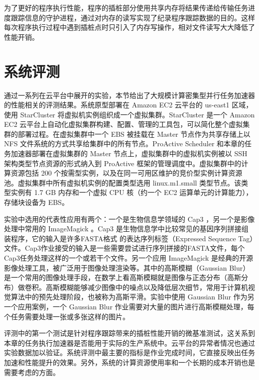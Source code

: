 为了更好的程序执行性能，程序的插桩部分使用共享内存将结果传递给传输任务进度跟踪信息的守护进程，通过对内存的读写实现了纪录程序跟踪数据的目的。这样每次程序执行过程中遇到插桩点时只引入了内存写操作，相对文件读写大大降低了性能开销。

\section{系统评测}
\label{sec:no2_eval}
通过一系列在云平台中展开的实验，本节给出了大规模计算密集型并行任务加速器的性能相关的评测结果。系统原型部署在 Amazon EC2 云平台的 us-east1 区域，使用 StarCluster \cite{starcluster} 将虚拟机实例组织成一个虚拟集群。StarCluster \cite{starcluster} 是一个 Amazon EC2 云平台上自动化虚拟集群构建、配置、管理的工具包，可以简化整个虚拟集群的部署过程。在虚拟集群中一个 EBS 被挂载在 Master 节点作为共享存储上以 NFS 文件系统的方式共享给集群中的所有节点。ProActive Scheduler 和本章的任务加速器部署在虚拟集群的 Master 节点上，虚拟集群中的虚拟机实例被以 SSH 架构类型节点资源的形式纳入到 ProActive 框架的管理调度中。虚拟集群中的计算资源包括 200 个按需型实例，以及在同一可用区维护的竞价型实例计算资源池。虚拟集群中所有虚拟机实例的配置类型选用 linux.m1.small 类型节点。该类型实例有 1.7 GB 内存和一个虚拟 CPU 核（约一个 EC2 运算单元的计算能力），存储块设备为 EBS。

实验中选用的代表性应用有两个：一个是生物信息学领域的 Cap3 \cite{Huang:1999:Cap3}，另一个是影像处理中常用的 ImageMagick \cite{imagemagick}。Cap3 是生物信息学中比较常见的基因序列拼接组装程序，它的输入是许多FASTA格式 \cite{fasta} 的表达序列标签（Expressed Sequence Tag）文件。Cap3作业接受的输入是一些需要尝试进行序列拼接的FASTA文件，每个Cap3任务处理这样的一个或若干个文件。另一个应用 ImageMagick 是经典的开源影像处理工具，被广泛用于图像处理渲染等。其中的高斯模糊（Gaussian Blur）是一个常用的图像处理手段，在数学上看高斯模糊就是图像与正态分布（高斯分布）做卷积。高斯模糊能够减少图像中的噪点以及降低层次细节，常用于计算机视觉算法中的预先处理阶段，也被称为高斯平滑。实验中使用 Gaussian Blur 作为另一个应用案例，一个 Gaussian Blur 作业需要对大量的图片进行高斯模糊处理，每个任务需要处理一张或多张这样的图片。

评测中的第一个测试是针对程序跟踪带来的插桩性能开销的微基准测试，这关系到本章的任务执行加速器是否能用于实际的生产系统中。云平台的异常者情况也通过实验数据加以验证。系统评测中最主要的指标是作业完成时间，它直接反映出任务加速和性能提升的效果。另外，系统的计算资源使用率和一个长期的成本开销也是需要考虑的方面。

